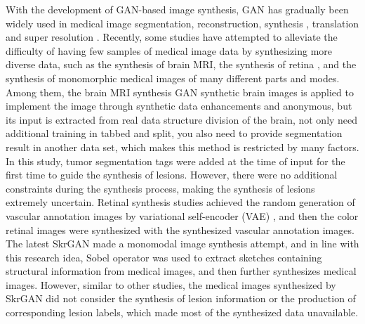 \documentclass[runningheads]{llncs}
\begin{document}
	With the development of GAN-based image synthesis, GAN has gradually been widely used in medical image segmentation\cite{40kamnitsas2017unsupervised}, reconstruction\cite{61fan2018a,65anirudh2018lose}, synthesis \cite{41costa2017towards,4shin2018medical,43iglesias2013is,44shrivastava2017learning}, translation \cite{2zhang2018translating,20nie2017medical,35osokin2017gans,36vannguyen2015crossdomain,40kamnitsas2017unsupervised,136yi2018sharpness-aware,137yang2018low-dose,138WolterinkGenerative} and super resolution \cite{14You2018CT,15lyu2018super-resolution}. 
	Recently, some studies have attempted to alleviate the difficulty of having few samples of medical image data by synthesizing more diverse data, such as the synthesis of brain MRI\cite{4shin2018medical}, the synthesis of retina \cite{41costa2017towards}, and the synthesis of monomorphic medical images of many different parts and modes\cite{96zhang2019skrgan:}. Among them, the brain MRI synthesis \cite{4shin2018medical} GAN synthetic brain images is applied to implement the image through synthetic data enhancements and anonymous, but its input is extracted from real data structure division of the brain, not only need additional training in tabbed and split, you also need to provide segmentation result in another data set, which makes this method is restricted by many factors. In this study, tumor segmentation tags were added at the time of input for the first time to guide the synthesis of lesions. However, there were no additional constraints during the synthesis process, making the synthesis of lesions extremely uncertain. Retinal synthesis studies\cite{41costa2017towards} achieved the random generation of vascular annotation images by variational self-encoder (VAE) \cite{87kingma2014auto-encoding,88rezende2014stochastic}, and then the color retinal images were synthesized with the synthesized vascular annotation images. The latest SkrGAN\cite{96zhang2019skrgan:} made a monomodal image synthesis attempt, and in line with this research idea, Sobel operator was used to extract sketches containing structural information from medical images, and then further synthesizes medical images. However, similar to other studies, the medical images synthesized by SkrGAN did not consider the synthesis of lesion information or the production of corresponding lesion labels, which made most of the synthesized data unavailable.
	
\end{document}
